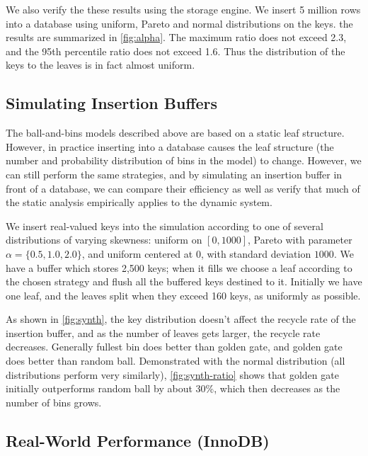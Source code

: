 

We also verify the these results using the \innodb{} storage engine. We insert
5 million rows into a database using uniform, Pareto and normal distributions
on the keys. the results are summarized in \cref{fig:alpha}. The maximum ratio
does not exceed 2.3, and the 95th percentile ratio does not exceed 1.6. Thus
the distribution of the keys to the leaves is in fact almost uniform.

\subsection{Simulating Insertion Buffers}\label{sec:br-exp-synthetic}

The ball-and-bins models described above are based on a static leaf structure.
However, in practice inserting into a database causes the leaf structure (the
number and probability distribution of bins in the model) to change. However,
we can still perform the same strategies, and by simulating an insertion buffer
in front of a database, we can compare their efficiency as well as verify that
much of the static analysis empirically applies to the dynamic system.

We insert real-valued keys into the simulation according to one of several
distributions of varying skewness: uniform on $[0,1000]$, Pareto with parameter
$\alpha=\{0.5,1.0,2.0\}$, and uniform centered at 0, with standard deviation
$1000$. We have a buffer which stores 2,500 keys; when it fills we choose a
leaf according to the chosen strategy and flush all the buffered keys destined
to it. Initially we have one leaf, and the leaves split when they exceed 160
keys, as uniformly as possible. 

As shown in \cref{fig:synth}, the key distribution doesn't affect the recycle
rate of the insertion buffer, and as the number of leaves gets larger, the
recycle rate decreases. Generally fullest bin does better than golden gate, and
golden gate does better than random ball. Demonstrated with the normal
distribution (all distributions perform very similarly), \cref{fig:synth-ratio}
shows that golden gate initially outperforms random ball by about 30\%, which
then decreases as the number of bins grows.



\subsection{Real-World Performance (InnoDB)}\label{sec:br-exp-innodb}

